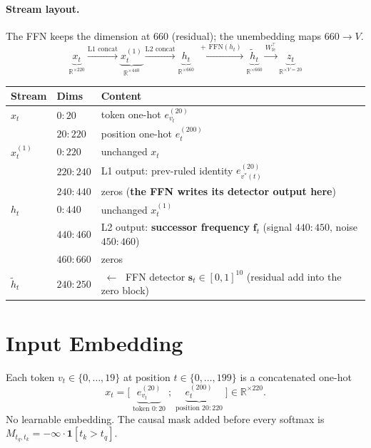 \documentclass[11pt]{article}
\newcommand{\ev}[2]{e^{(#1)}_{#2}}        %
\newcommand{\R}{\mathbb{R}}
\newcommand{\T}{^{\!\top}}
\newcommand{\vstar}{v^{*}}
\newcommand{\fvec}{\mathbf{f}}
\newcommand{\one}{\mathbf{1}}
\begin{document}
\paragraph{Stream layout.} The FFN keeps the dimension at $660$ (residual); the unembedding
maps $660\to V$.
\[
\underbrace{x_t}_{\R^{\times220}}
\xrightarrow{\text{L1 concat}}
\underbrace{x^{(1)}_t}_{\R^{\times440}}
\xrightarrow{\text{L2 concat}}
\underbrace{h_t}_{\R^{\times660}}
\xrightarrow{\;+\,\mathrm{FFN}(h_t)\;}
\underbrace{\tilde h_t}_{\R^{\times660}}
\xrightarrow{W_{\mathrm{fc}}\T}
\underbrace{z_t}_{\R^{\times V=20}}
\]
\begin{center}\small
\begin{tabular}{@{}lll@{}}
\toprule
Stream & Dims & Content\\
\midrule
$x_t$        & $0{:}20$    & token one-hot $\ev{20}{v_t}$\\
             & $20{:}220$  & position one-hot $\ev{200}{t}$\\
$x^{(1)}_t$  & $0{:}220$   & unchanged $x_t$\\
             & $220{:}240$ & L1 output: prev-ruled identity $\ev{20}{\vstar(t)}$\\
             & $240{:}440$ & zeros \quad(\textbf{the FFN writes its detector output here})\\
$h_t$        & $0{:}440$   & unchanged $x^{(1)}_t$\\
             & $440{:}460$ & L2 output: \textbf{successor frequency} $\fvec_t$ (signal $440{:}450$, noise $450{:}460$)\\
             & $460{:}660$ & zeros\\
$\tilde h_t$ & $240{:}250$ & $\;\leftarrow\;$ FFN detector $\mathbf{s}_t\in[0,1]^{10}$ (residual add into the zero block)\\
\bottomrule
\end{tabular}
\end{center}

\section{Input Embedding}
Each token $v_t\in\{0,\dots,19\}$ at position $t\in\{0,\dots,199\}$ is a concatenated one-hot
\begin{equation}
x_t=\Big[\;\underbrace{\ev{20}{v_t}}_{\text{token }0:20}\;;\;\underbrace{\ev{200}{t}}_{\text{position }20:220}\;\Big]\in\R^{\times220}.
\end{equation}
No learnable embedding. The causal mask added before every softmax is
$M_{t_q,t_k}=-\infty\cdot\one[t_k>t_q]$.
\end{document}
